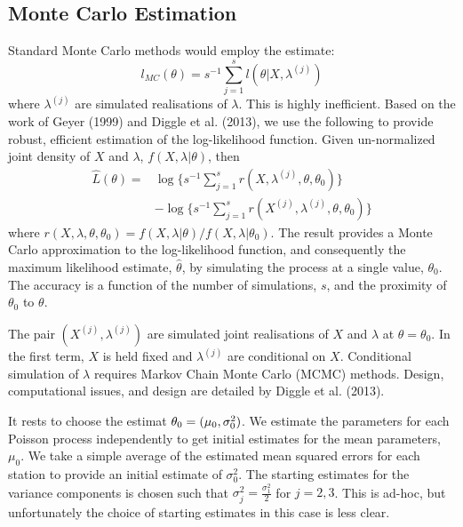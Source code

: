 \documentclass{acm_proc_article-sp}
\begin{document}
\subsection{Monte Carlo Estimation} 
Standard Monte Carlo methods would employ the estimate:
\begin{equation}
l_{MC} (\theta) = s^{-1} \sum_{j=1}^s l \left( \theta | X, \lambda^{(j)} \right)
\end{equation}
\noindent where $\lambda^{(j)}$ are simulated realisations of $\lambda$.  This is highly inefficient.  Based on the work of Geyer (1999) and Diggle et al. (2013), we use the following to provide robust, efficient estimation of the log-likelihood function.  Given un-normalized joint density of $X$ and $\lambda$, $f(X, \lambda | \theta)$, then 
\begin{align}
\hat{L} \left( \theta \right) =& \log \big \{ s^{-1} \sum_{j=1}^s r \left( X , \lambda^{(j)} , \theta, \theta_0 \right) \big \} \\
&- \log \big \{ s^{-1} \sum_{j=1}^s r \left( X^{(j)} , \lambda^{(j)} , \theta, \theta_0 \right) \big \}
\end{align}
\noindent where $r(X, \lambda, \theta, \theta_0) = f(X, \lambda | \theta)/f(X, \lambda | \theta_0)$. The result provides a Monte Carlo approximation to the log-likelihood function, and consequently the maximum likelihood estimate, $\hat{\theta}$, by simulating the process at a single value, $\theta_0$.  The accuracy is a function of the number of simulations, $s$, and the proximity of $\theta_0$ to $\theta$.

The pair $(X^{(j)}, \lambda^{(j)})$ are simulated joint realisations of $X$ and $\lambda$ at $\theta = \theta_0$.  In the first term, $X$ is held fixed and $\lambda^{(j)}$ are conditional on $X$.  Conditional simulation of $\lambda$ requires Markov Chain Monte Carlo (MCMC) methods.  Design, computational issues, and design are detailed by Diggle et al. (2013).

It rests to choose the estimat $\theta_0 = (\mu_0 , {\bf \sigma}_0^2)$.  We estimate the parameters for each Poisson process independently to get initial estimates for the mean parameters, $\mu_0$.  We take a simple average of the estimated mean squared errors for each station to provide an initial estimate of $\sigma_0^2$.  The starting estimates for the variance components is chosen such that $\sigma_j^2 = \frac{\sigma_1^2}{2}$ for $j = 2,3$.  This is ad-hoc, but unfortunately the choice of starting estimates in this case is less clear.
\end{document}
